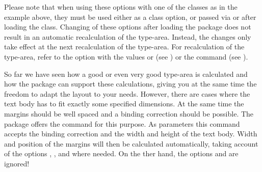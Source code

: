 Please note that when using these options with one of the
{\KOMAScript} classes as in the example above, they must be used
either as a class option, or passed via  or
 after loading the class. Changing of these options
after loading the  package does not result in an
automatic recalculation of the type-area. Instead, the changes only
take effect at the next recalculation of the type-area. For
recalculation of the type-area, refer to the  option with
the values  or  (see
) or the
 command (see
).%
%
%


%
\begin{Declaration}
\end{Declaration}%
So far we have seen how a good or even very good
type-area is calculated and how the
 package can support these calculations, giving you
at the same time the freedom to adapt the layout to your needs.
However, there are cases where the text body has to fit exactly some
specified dimensions. At the same time the margins should be well
spaced and a binding correction should be possible. The
 package offers the command  for this
purpose. As parameters this command accepts the binding correction and
the width and height of the text body.  Width and position of the
margins will then be calculated automatically, taking account of the
options , ,
 and  where
needed.  On the ther hand, the options
 and
 are ignored!

